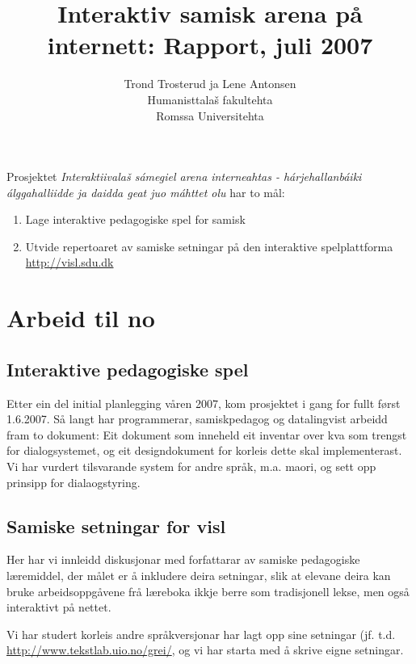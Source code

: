 \documentclass[a4paper,norsk]{article}
\begin{document}
\title{Interaktiv samisk arena på internett: Rapport, juli 2007}


\author{Trond Trosterud ja Lene Antonsen\\
Humanisttalaš fakultehta\\
Romssa Universitehta}

\maketitle


Prosjektet \textit{Interaktiivalaš sámegiel arena interneahtas - hárjehallanbáiki álggahalliidde ja daidda geat juo máhttet olu} har to mål:

\begin{enumerate}
\item Lage interaktive pedagogiske spel for samisk
\item Utvide repertoaret av samiske setningar på den interaktive spelplattforma \url{http://visl.sdu.dk}
\end{enumerate}

\section{Arbeid til no}

\subsection{Interaktive pedagogiske spel}

Etter ein del initial planlegging våren 2007, kom prosjektet i gang for fullt først 1.6.2007. Så langt har programmerar, samiskpedagog og datalingvist arbeidd fram to dokument: Eit dokument som inneheld eit inventar over kva som trengst for dialogsystemet, og eit designdokument for korleis dette skal implementerast.   Vi har vurdert tilsvarande system for andre språk, m.a. maori, og sett opp prinsipp for dialaogstyring.

\subsection{Samiske setningar for visl}

Her har vi innleidd diskusjonar med forfattarar av samiske pedagogiske læremiddel, der målet er å inkludere deira setningar, slik at elevane deira kan bruke arbeidsoppgåvene frå læreboka ikkje berre som tradisjonell lekse, men også interaktivt på nettet.

Vi har studert korleis andre språkversjonar har lagt opp sine setningar (jf. t.d. \url{http://www.tekstlab.uio.no/grei/}, og vi har starta med å skrive eigne setningar.
\end{document}
